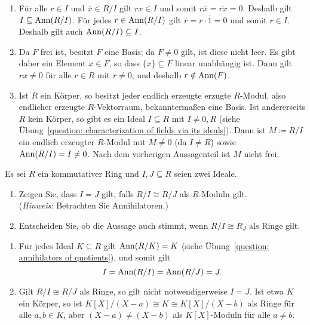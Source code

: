 \begin{solution}
  \begin{enumerate}
    \item
      Für alle $r \in I$ und $\overline{x} \in R/I$ gilt $rx \in I$ und somit $r \overline{x} = \overline{rx} = 0$.
      Deshalb gilt $I \subseteq \operatorname{Ann}(R/I)$.
      Für jedes $r \in \operatorname{Ann}(R/I)$ gilt $\overline{r} = r \cdot \overline{1} = 0$ und somit $r \in I$.
      Deshalb gilt auch $\operatorname{Ann}(R/I) \subseteq I$.
    \item
      Da $F$ frei ist, besitzt $F$ eine Basis; da $F \neq 0$ gilt, ist diese nicht leer.
      Es gibt daher ein Element $x \in F$, so dass $\{x\} \subseteq F$ linear unabhängig ist.
      Dann gilt $rx \neq 0$ für alle $r \in R$ mit $r \neq 0$, und deshalb $r \notin \operatorname{Ann}(F)$.
    \item
      Ist $R$ ein Körper, so besitzt jeder endlich erzeugte erzugte $R$-Modul, also endlicher erzeugte $R$-Vektorraum, bekanntermaßen eine Basis.
      Ist andererseits $R$ kein Körper, so gibt es ein Ideal $I \subseteq R$ mit $I \neq 0, R$ (siehe Übung~\ref{question: characterization of fields via its ideals}).
      Dann ist $M \coloneqq R/I$ ein endlich erzeugter $R$-Modul mit $M \neq 0$ (da $I \neq R$) sowie $\operatorname{Ann}(R/I) = I \neq 0$.
      Nach dem vorherigen Aussagenteil ist $M$ nicht frei.
  \end{enumerate}
\end{solution}


\begin{question}[subtitle = Isomorphie von Quotientenringen als Moduln]
  \label{question: quotients isomorphic as modules}
  Es sei $R$ ein kommutativer Ring und $I, J \subseteq R$ seien zwei Ideale.
  \begin{enumerate}
    \item
      Zeigen Sie, dass $I = J$ gilt, falls $R/I \cong R/J$ als $R$-Moduln gilt.
      \\
      (\emph{Hinweis}:
       Betrachten Sie Annihilatoren.)
    \item
      Entscheiden Sie, ob die Aussage auch stimmt, wenn $R/I \cong R_J$ als Ringe gilt.
  \end{enumerate}
\end{question}


\begin{solution}
  \begin{enumerate}
    \item
      Für jedes Ideal $K \subseteq R$ gilt $\operatorname{Ann}(R/K) = K$ (siehe Übung~\ref{question: annihilators of quotients}), und somit gilt
      \[
          I
        = \operatorname{Ann}(R/I)
        = \operatorname{Ann}(R/J)
        = J.
      \]
      
    \item
      Gilt $R/I \cong R/J$ als Ringe, so gilt nicht notwendigerweise $I = J$.
      Ist etwa $K$ ein Körper, so ist $K[X]/(X-a) \cong K \cong K[X]/(X-b)$ als Ringe für alle $a, b \in K$, aber $(X-a) \neq (X-b)$ als $K[X]$-Moduln für alle $a \neq b$.
  \end{enumerate}
\end{solution}


